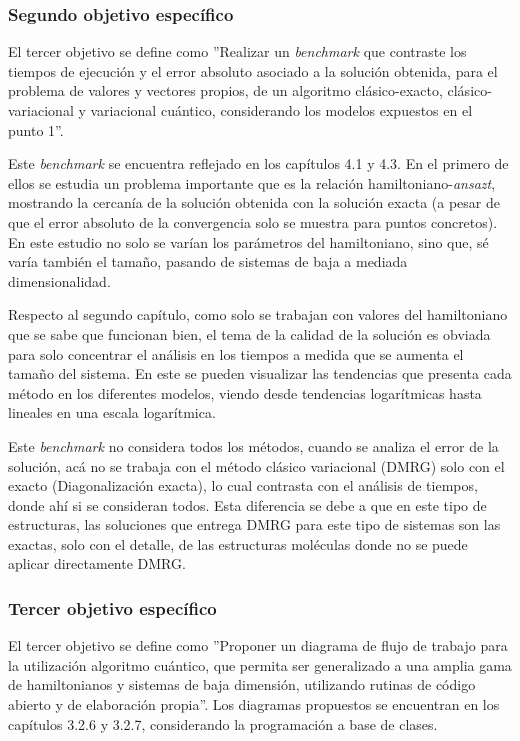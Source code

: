 \subsubsection{Segundo objetivo específico}
El tercer objetivo se define como ''Realizar un \textit{benchmark} que contraste los tiempos de ejecución y el error absoluto asociado a la solución obtenida, para el problema de valores y vectores propios, de un algoritmo clásico-exacto, clásico-variacional y variacional cuántico, considerando los modelos expuestos en el punto 1''.

Este \textit{benchmark} se encuentra reflejado en los capítulos 4.1 y 4.3. En el primero de ellos se estudia un problema importante que es la relación hamiltoniano-\textit{ansazt}, mostrando la cercanía de la solución obtenida con la solución exacta (a pesar de que el error absoluto de la convergencia solo se muestra para puntos concretos). En este estudio no solo se varían los parámetros del hamiltoniano, sino que, sé varía también el tamaño, pasando de sistemas de baja a mediada dimensionalidad. 

Respecto al segundo capítulo, como solo se trabajan con valores del hamiltoniano que se sabe que funcionan bien, el tema de la calidad de la solución es obviada para solo concentrar el análisis en los tiempos a medida que se aumenta el tamaño del sistema. En este se pueden visualizar las tendencias que presenta cada método en los diferentes modelos, viendo desde tendencias logarítmicas hasta lineales en una escala logarítmica.

Este \textit{benchmark} no considera todos los métodos, cuando se analiza el error de la solución, acá no se trabaja con el método clásico variacional (DMRG) solo con el exacto (Diagonalización exacta), lo cual contrasta con el análisis de tiempos, donde ahí si se consideran todos. Esta diferencia se debe a que en este tipo de estructuras, las soluciones que entrega DMRG para este tipo de sistemas son las exactas, solo con el detalle, de las estructuras moléculas donde no se puede aplicar directamente DMRG.

\subsubsection{Tercer objetivo específico}
El tercer objetivo se define como ''Proponer un diagrama de flujo de trabajo para la utilización algoritmo cuántico, que permita ser generalizado a una amplia gama de hamiltonianos y sistemas de baja dimensión, utilizando rutinas de código abierto y de elaboración propia''. Los diagramas propuestos se encuentran en los capítulos 3.2.6 y 3.2.7, considerando la programación a base de clases.


